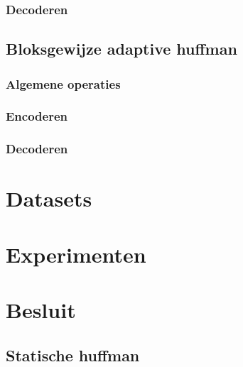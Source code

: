 \documentclass[a4paper,12pt]{report}
\begin{document}
\subsection{Decoderen}


\section{Bloksgewijze adaptive huffman}
\subsection{Algemene operaties}

\subsection{Encoderen}

\subsection{Decoderen}


\chapter{Datasets}

\chapter{Experimenten}


\chapter{Besluit}
\section{Statische huffman}
\end{document}

